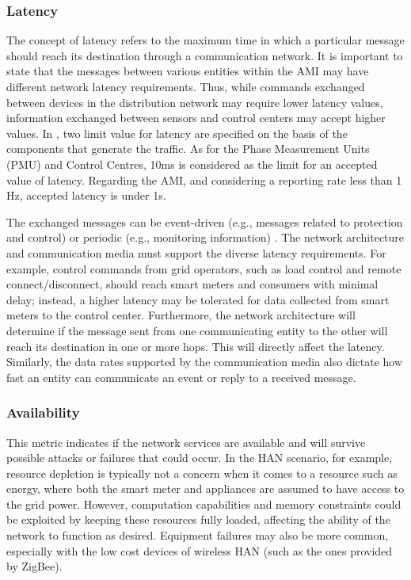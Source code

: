 \documentclass[10pt,twocolumn,twoside,submit]{JCNtran}
\begin{document}
\subsubsection{Latency}

The concept of latency refers to the maximum time in which a particular message should reach its destination through a communication network. It is important to state that the messages between various entities within the AMI may have different network latency requirements. Thus, while commands exchanged between devices in the distribution network may require lower latency values, information exchanged between sensors and control centers may accept higher values. In \cite{Xu2011}, two limit value for latency are specified on the basis of the components that generate the traffic. As for the Phase Measurement Units (PMU) and Control Centres, 10ms is considered as the limit for an accepted value of latency.  Regarding the AMI, and considering a reporting rate less than 1 Hz, accepted latency is under 1s.

The exchanged messages can be event-driven (e.g., messages related to protection and control) or periodic (e.g., monitoring information) \cite{Winter2012}. The network architecture and communication media must support the diverse latency requirements. For example, control commands from grid operators, such as load control and remote connect/disconnect, should reach smart meters and consumers with minimal delay; instead, a higher latency may be tolerated for data collected from smart meters to the control center. Furthermore, the network architecture will determine if the message sent from one communicating entity to the other will reach its destination in one or more hops. This will directly affect the latency. Similarly, the data rates supported by the communication media also dictate how fast an entity can communicate an event or reply to a received message. 

\subsubsection{Availability}

 This metric indicates if the network services are available and will survive possible attacks or failures that could occur. In the HAN scenario, for example, resource depletion is typically not a concern when it comes to a resource such as energy, where both the smart meter and appliances are assumed to have access to the grid power. However, computation capabilities and memory constraints could be exploited by keeping these resources fully loaded, affecting the ability of the network to function as desired. Equipment failures may also be more common, especially with the low cost devices of wireless HAN (such as the ones provided by ZigBee).
\end{document}
